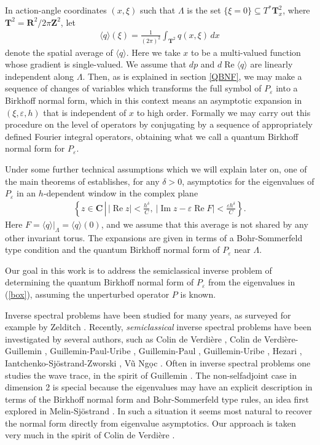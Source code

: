 \documentclass[12pt,lettersize]{article}
\DeclareMathOperator{\Real}{Re}
\DeclareMathOperator{\Imag}{Im}
\renewcommand{\epsilon}{\varepsilon}
\theoremstyle{plain}%
\numberwithin{theorem}{section}
\numberwithin{equation}{section}
\theoremstyle{definition}
\theoremstyle{remark}
\begin{document}
In action-angle coordinates $(x,\xi)$ such that $\Lambda$ is the set $\{\xi = 0\} \subseteq T^* \mathbf{T}^2_x$, where $\mathbf{T}^2 = \mathbf{R}^2/2\pi \mathbf{Z}^2$, let 
%
\begin{align}\label{avg}
\langle q \rangle (\xi) = \frac{1}{(2\pi)^2} \int_{\mathbf{T}^2} q(x,\xi)\, dx
\end{align}
%
denote the spatial average of $\langle q \rangle$. Here we take $x$ to be a multi-valued function whose gradient is single-valued. We assume that $dp$ and $d\Real \langle q \rangle$ are linearly independent along $\Lambda$. Then, as is explained in section \ref{QBNF}, we may make a sequence of changes of variables which transforms the full symbol of $P_\epsilon$ into a Birkhoff normal form, which in this context means an asymptotic expansion in $(\xi,\epsilon,h)$ that is independent of $x$ to high order. Formally we may carry out this procedure on the level of operators by conjugating by a sequence of appropriately defined Fourier integral operators, obtaining what we call a quantum Birkhoff normal form for $P_\epsilon$. 

Under some further technical assumptions which we will explain later on, one of the main theorems of \cite{HSV} establishes, for any $\delta > 0$, asymptotics for the eigenvalues of $P_\epsilon$ in an $h$-dependent window in the complex plane
%
\begin{align}\label{box}
\left\{z \in \mathbf{C} \, \left| \, |\Real z| < \frac{h^\delta}{C},\ |\Imag z - \epsilon \Real F| < \frac{\epsilon h^\delta}{C}\right.\right\}.
\end{align}
%
Here $F = \langle q \rangle|_\Lambda = \langle q \rangle(0)$, and we assume that this average is not shared by any other invariant torus. The expansions are given in terms of a Bohr-Sommerfeld type condition and the quantum Birkhoff normal form of $P_\epsilon$ near $\Lambda$. 

Our goal in this work is to address the semiclassical inverse problem of determining the quantum Birkhoff normal form of $P_\epsilon$ from the eigenvalues in (\ref{box}), assuming the unperturbed operator $P$ is known. 

Inverse spectral problems have been studied for many years, as surveyed for example by Zelditch \cite{Zelditch}. Recently, \textit{semiclassical} inverse spectral problems have been investigated by several authors, such as Colin de Verdi{\`e}re \cite{CdVII}\cite{CdV}, Colin de Verdi{\`e}re-Guillemin \cite{CdVI}\cite{ColindeVerdiereGuillemin}, Guillemin-Paul-Uribe \cite{GuilleminPaulUribe}, Guillemin-Paul \cite{GuilleminPaul}, Guillemin-Uribe \cite{GuilleminUribe}, Hezari \cite{Hezari}, Iantchenko-Sj\"ostrand-Zworski \cite{IantchenkoSjostrandZworski}, V{\~u} Ng{\d{o}}c \cite{VuNgoc}. Often in inverse spectral problems one studies the wave trace, in the spirit of Guillemin \cite{Guillemin}. The non-selfadjoint case in dimension 2 is special because the eigenvalues may have an explicit description in terms of the Birkhoff normal form and Bohr-Sommerfeld type rules, an idea first explored in Melin-Sj\"ostrand \cite{MeSj}. In such a situation it seems most natural to recover the normal form directly from eigenvalue asymptotics. Our approach is taken very much in the spirit of Colin de Verdi{\`e}re \cite{CdV}. 
\end{document}
